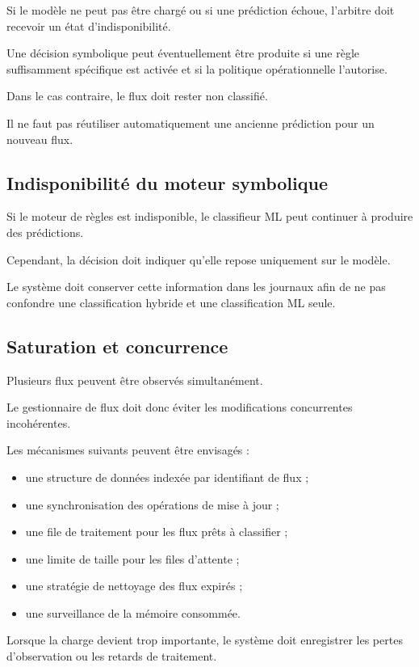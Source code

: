 Si le modèle ne peut pas être chargé ou si une prédiction échoue, l'arbitre doit recevoir un état d'indisponibilité.

Une décision symbolique peut éventuellement être produite si une règle suffisamment spécifique est activée et si la politique opérationnelle l'autorise.

Dans le cas contraire, le flux doit rester non classifié.

Il ne faut pas réutiliser automatiquement une ancienne prédiction pour un nouveau flux.

\subsection{Indisponibilité du moteur symbolique}

Si le moteur de règles est indisponible, le classifieur ML peut continuer à produire des prédictions.

Cependant, la décision doit indiquer qu'elle repose uniquement sur le modèle.

Le système doit conserver cette information dans les journaux afin de ne pas confondre une classification hybride et une classification ML seule.

\subsection{Saturation et concurrence}

Plusieurs flux peuvent être observés simultanément.

Le gestionnaire de flux doit donc éviter les modifications concurrentes incohérentes.

Les mécanismes suivants peuvent être envisagés :

\begin{itemize}
    \item une structure de données indexée par identifiant de flux ;
    \item une synchronisation des opérations de mise à jour ;
    \item une file de traitement pour les flux prêts à classifier ;
    \item une limite de taille pour les files d'attente ;
    \item une stratégie de nettoyage des flux expirés ;
    \item une surveillance de la mémoire consommée.
\end{itemize}

Lorsque la charge devient trop importante, le système doit enregistrer les pertes d'observation ou les retards de traitement.

